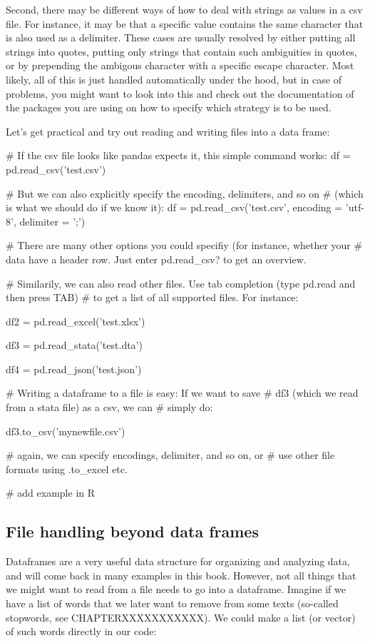 Second, there may be different ways of how to deal with strings as values in a csv file. For instance, it may be that a specific value contains the same character that is also used as a delimiter. These cases are usually resolved by either putting all strings into quotes, putting only strings that contain such ambiguities in quotes, or by prepending the ambigous character with a specific escape character. Most likely, all of this is just handled automatically under the hood, but in case of problems, you might want to look into this and check out the documentation of the packages you are using on how to specify which strategy is to be used.

Let's get practical and try out reading and writing files into a data frame:

\begin{examplepy}
# If the csv file looks like pandas expects it, this simple command works:
df = pd.read_csv('test.csv')

# But we can also explicitly specify the encoding, delimiters, and so on
# (which is what we should do if we know it):
df = pd.read_csv('test.csv', encoding = 'utf-8', delimiter = ';')

# There are many other options you could specifiy (for instance, whether your
# data have a header row. Just enter pd.read_csv? to get an overview.

# Similarily, we can also read other files. Use tab completion (type pd.read and then press TAB)
# to get a list of all supported files. For instance:

df2 = pd.read_excel('test.xlsx')

df3 = pd.read_stata('test.dta')

df4 = pd.read_json('test.json')

# Writing a dataframe to a file is easy: If we want to save
# df3 (which we read from a stata file) as a csv, we can
# simply do:

df3.to_csv('mynewfile.csv')

# again, we can specify encodings, delimiter, and so on, or
# use other file formats using .to_excel etc.

\end{examplepy}


\begin{exampler}
# add example in R
\end{exampler}




\subsection{File handling beyond data frames}
Dataframes are a very useful data structure for organizing and analyzing data, and will come back in many examples in this book.
However, not all things that we might want to read from a file needs to go into a dataframe.
Imagine if we have a list of words that we later want to remove from some texts (so-called stopwords, see CHAPTERXXXXXXXXXXX).
We could make a list (or vector) of such words directly in our code:

